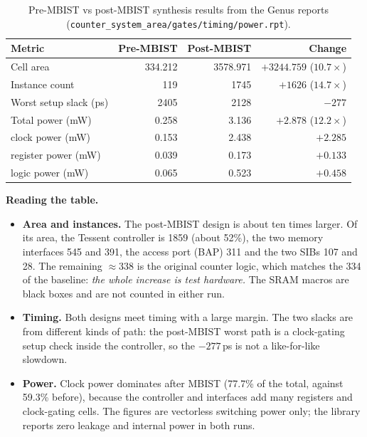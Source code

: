 \documentclass[11pt]{article}
\newcommand{\code}[1]{\texttt{\small #1}}
\begin{document}
\begin{table}[H]
\centering
\begin{tabular}{@{}lrrr@{}}
\toprule
\textbf{Metric} & \textbf{Pre-MBIST} & \textbf{Post-MBIST} & \textbf{Change} \\
\midrule
Cell area                 & 334.212   & 3578.971  & $+3244.759$ ($10.7\times$) \\
Instance count            & 119       & 1745      & $+1626$ ($14.7\times$) \\
Worst setup slack (ps)    & 2405      & 2128      & $-277$ \\
Total power (mW)          & 0.258     & 3.136     & $+2.878$ ($12.2\times$) \\
\quad clock power (mW)    & 0.153     & 2.438     & $+2.285$ \\
\quad register power (mW) & 0.039     & 0.173     & $+0.133$ \\
\quad logic power (mW)    & 0.065     & 0.523     & $+0.458$ \\
\bottomrule
\end{tabular}
\caption{Pre-MBIST vs post-MBIST synthesis results from the Genus reports (\code{counter\_system\_area/gates/timing/power.rpt}).}
\label{tab:ppa}
\end{table}

\textbf{Reading the table.}
\begin{itemize}
  \item \textbf{Area and instances.} The post-MBIST design is about ten times larger. Of its area, the Tessent controller is 1859 (about 52\%), the two memory interfaces 545 and 391, the access port (BAP) 311 and the two SIBs 107 and 28. The remaining $\approx$338 is the original counter logic, which matches the 334 of the baseline: \emph{the whole increase is test hardware.} The SRAM macros are black boxes and are not counted in either run.
  \item \textbf{Timing.} Both designs meet timing with a large margin. The two slacks are from different kinds of path: the post-MBIST worst path is a clock-gating setup check inside the controller, so the $-277$\,ps is not a like-for-like slowdown.
  \item \textbf{Power.} Clock power dominates after MBIST (77.7\% of the total, against 59.3\% before), because the controller and interfaces add many registers and clock-gating cells. The figures are vectorless switching power only; the library reports zero leakage and internal power in both runs.
\end{itemize}
\end{document}
